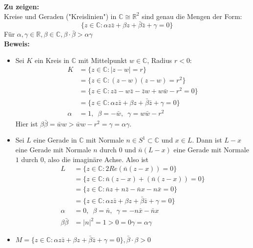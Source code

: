\begin{problem*}[1]
\textbf{Zu zeigen:} \\
Kreise und Geraden ("Kreislinien") in $ \mathbb{C} \cong \mathbb{R}^2$ sind genau die Mengen der Form:
\begin{equation*}
	\{ z \in \mathbb{C} : \alpha z \bar{z}+ \beta z + \bar{\beta}\bar{z}  + \gamma = 0\} 
\end{equation*}
Für $\alpha, \gamma \in \mathbb{R}, \beta \in \mathbb{C}, \beta \cdot \bar{ \beta } > \alpha \gamma$ \\
\textbf{Beweis:}
\begin{itemize}
	\item Sei $ K $ ein Kreis in $\mathbb{C}$ mit Mittelpunkt $w \in \mathbb{C}$, Radius $r < 0$:
	\begin{align*}	
	K &= \{ z \in \mathbb{C} : \vert z - w \vert = r \} \\
	&= \{ z \in \mathbb{C} : (z - w)(z-w) = r^2\} \\
	&= \{ z \in \mathbb{C} : z \bar{z} - w \bar{z} - \bar{z} w + w \bar{w} - r^2 = 0 \} \\
	&= \{ z \in \mathbb{C} : \alpha z \bar{z} + \beta z + \bar{\beta} \bar{z} + \gamma = 0 \} \\
	\alpha &= 1, \enspace \beta = - \bar{w}, \enspace \gamma = w \bar{w} - r^2
	\end{align*}
	Hier ist $\beta \bar{\beta} = \bar{w}w > \bar{w} w - r^2 = \gamma = \alpha \gamma$.
	\item Sei $ L $ eine Gerade in $\mathbb{C}$ mit Normale $n \in S^1 \subset \mathbb{C}$ und $ x \in L$. Dann ist $L - x$ eine Gerade mit Normale $n$ durch $ 0 $ und $\bar{n}(L -x)$ eine Gerade mit Normale $ 1 $ durch $ 0 $, also die imaginäre Achse.
	Also ist 
	\begin{align*}
	L &= \{ z \in \mathbb{C}: 2 Re(\bar{n}(z - x)) = 0 \} \\
	&= \{ z \in \mathbb{C}: \bar{n}(z-x) + (\bar{n}(z - x)) = 0 \} \\
	&= \{ z \in \mathbb{C}: \bar{n}z + n \bar{z} - \bar{n}x - n \bar{x}= 0 \} \\
	&= \{ z \in \mathbb{C}: \alpha z \bar{z} + \beta z + \bar{\beta} \bar{z} + \gamma = 0 \} \\
	\alpha &= 0, \enspace \beta = \bar{n}, \enspace \gamma = -n \bar{x} - \bar{n} x \\
	\beta \bar{\beta} &= \vert n \vert^2 = 1 > 0 = 0 \gamma = \alpha \gamma
	 \end{align*} 
	\item $M = \{ z \in \mathbb{C} : \alpha z \bar{z} + \beta z + \bar{\beta} \bar{z} + \gamma = 0 \}, \bar{\beta} \cdot \beta > 0$ \\

\end{itemize}
\end{problem*}

